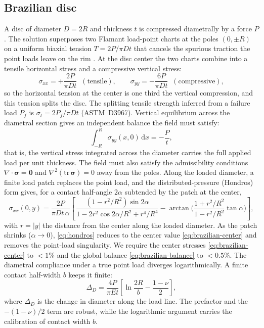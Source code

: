 \documentclass{svjour3}                 %
\newcommand{\grad}{\nabla}
\begin{document}
\begin{appendix}
\subsection{Brazilian disc}\label{app:brazilian}

A disc of diameter $D=2R$ and thickness $t$ is compressed diametrally by a force $P$. The
solution superposes two Flamant load-point charts at the poles $(0,\pm R)$ on a uniform
biaxial tension $T=2P/\pi Dt$ that cancels the spurious traction the point loads leave on
the rim \citep{timoshenko1970elasticity}. At the disc center the two charts combine into a
tensile horizontal stress and a compressive vertical stress:
\begin{equation}\label{eq:brazilian-center}
  \sigma_{xx} = +\frac{2P}{\pi D t} \;\;(\text{tensile}),
  \qquad
  \sigma_{yy} = -\frac{6P}{\pi D t} \;\;(\text{compressive}),
\end{equation}
so the horizontal tension at the center is one third the vertical compression, and this
tension splits the disc. The splitting tensile strength inferred from a failure load $P_f$
is $\sigma_t = 2P_f/\pi D t$ (ASTM~D3967). Vertical equilibrium across the
diametral section gives an independent balance the field must satisfy:
\begin{equation}\label{eq:brazilian-balance}
  \int_{-R}^{R}\sigma_{yy}(x,0)\,\mathrm{d}x = -\frac{P}{t},
\end{equation}
that is, the vertical stress integrated across the diameter carries the full applied load
per unit thickness. The field must also satisfy the admissibility conditions
$\grad\!\cdot\bm{\sigma}=\bm{0}$ and $\grad^2(\mathrm{tr}\,\bm{\sigma})=0$ away from the
poles. Along the loaded diameter, a finite load patch replaces the point load, and the
distributed-pressure (Hondros) form \citep{hondros1959evaluation} gives, for a contact
half-angle $2\alpha$ subtended by the patch at the center,
\begin{equation}\label{eq:hondros}
  \sigma_{xx}(0,y) = \frac{2P}{\pi D t\,\alpha}\!\left[\,
    \frac{(1-r^2/R^2)\sin 2\alpha}{1-2r^2\cos2\alpha/R^2+r^4/R^4}
    -\arctan\!\Big(\frac{1+r^2/R^2}{1-r^2/R^2}\tan\alpha\Big)\right],
\end{equation}
with $r=|y|$ the distance from the center along the loaded diameter. As the patch shrinks
($\alpha\to0$), \eqref{eq:hondros} reduces to the center value \eqref{eq:brazilian-center}
and removes the point-load singularity. We require the center stresses
\eqref{eq:brazilian-center} to $<1\%$ and the global balance \eqref{eq:brazilian-balance}
to $<0.5\%$. The diametral compliance under a true point load diverges logarithmically. A
finite contact half-width $b$ keeps it finite:
\begin{equation}\label{eq:brazilian-compliance}
  \Delta_D = \frac{4P}{\pi E t}\!\left[\ln\frac{2R}{b}-\frac{1-\nu}{2}\right],
\end{equation}
where $\Delta_D$ is the change in diameter along the load line. The prefactor and the
$-(1-\nu)/2$ term are robust, while the logarithmic argument carries the calibration of
contact width $b$.


\end{appendix}
\end{document}
